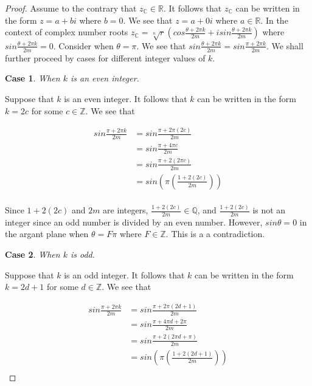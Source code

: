 \documentclass{article}
\newtheorem{case}{Case}
\begin{document}
\begin{proof}
    Assume to the contrary that \(z_{\mathds{C}} \in \mathds{R}\). It follows that \(z_{\mathds{C}}\) can be written in the form \(z = a + bi\) where \(b = 0\). We see that \(z = a + 0i\) where \(a \in \mathds{R}\). In the context of complex number roots \(z_{\mathds{C}} = {\sqrt[n]{r}}{\left(cos{\frac{\theta + {2\pi}k}{2m} + isin{\frac{\theta + {2\pi}k}{2m}}}\right)}\) where \(sin{\frac{\theta + {2\pi}k}{2m}} = 0\). Consider when \(\theta = \pi\). We see that \(sin{\frac{\theta + {2\pi}k}{2m}} = sin{\frac{\pi + {2\pi}k}{2m}}\). We shall further proceed by cases for different integer values of \(k\). 
    
    \begin{case}
        When \(k\) is an even integer.
    \end{case}

    Suppose that \(k\) is an even integer. It follows that \(k\) can be written in the form \(k = 2c\) for some \(c \in \mathds{Z}\). We see that 

    \begin{align*}
        sin{\frac{\pi + {2\pi}k}{2m}} &= sin{\frac{\pi + {2\pi}(2c)}{2m}} \\ 
                                      &= sin{\frac{\pi + {4\pi}c}{2m}} \\
                                      &= sin{\frac{\pi + 2(2{\pi}c)}{2m}} \\ 
                                      &= sin\left({\pi}\left({\frac{1 + 2(2c)}{2m}}\right)\right) \\ 
    \end{align*} 

    Since \(1 + 2(2c)\) and \(2m\) are integers, \(\frac{1 + 2(2c)}{2m} \in \mathds{Q}\), and \(\frac{1 + 2(2c)}{2m}\) is not an integer since an odd number is divided by an even number. However, \(sin\theta = 0\) in the argant plane when \(\theta = F\pi\) where \(F \in \mathds{Z}\). This is a a contradiction. 

    \begin{case}
        When \(k\) is odd. 
    \end{case} 

    Suppose that \(k\) is an odd integer. It follows that \(k\) can be written in the form \(k = 2d + 1\) for some \(d \in \mathds{Z}\). We see that 

    \begin{align*}
        sin{\frac{\pi + {2\pi}k}{2m}} &= sin{\frac{\pi + {2\pi}(2d + 1)}{2m}} \\ 
                                      &= sin{\frac{\pi + {4\pi}d + 2\pi}{2m}} \\
                                      &= sin{\frac{\pi + 2(2{\pi}d + \pi)}{2m}} \\ 
                                      &= sin\left({\pi}\left({\frac{1 + 2(2d + 1)}{2m}}\right)\right) \\ 
    \end{align*} 


\end{proof}
\end{document}
